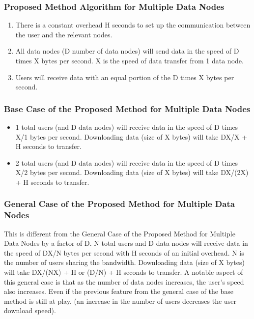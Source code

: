 \documentclass[acmsmall]{acmart}
\begin{document}
\subsubsection{Proposed Method Algorithm for Multiple Data Nodes}
\begin{enumerate}
    \item There is a constant overhead H seconds to set up the communication between the user and the relevant nodes.
    \item All data nodes (D number of data nodes) will send data in the speed of D times X bytes per second. X is the speed of data transfer from 1 data node.
    \item Users will receive data with an equal portion of the D times X bytes per second.
\end{enumerate}


\subsubsection{Base Case of the Proposed Method for Multiple Data Nodes}
\begin{itemize}
    \item 1 total users (and D data nodes) will receive data in the speed of D times X/1 bytes per second. Downloading data (size of X bytes) will take DX/X + H seconds to transfer.
    \item 2 total users (and D data nodes) will receive data in the speed of D times X/2 bytes per second. Downloading data (size of X bytes) will take DX/(2X) + H seconds to transfer.
\end{itemize}




\subsubsection{General Case of the Proposed Method for Multiple Data Nodes} 
This is different from the General Case of the Proposed Method for Multiple Data Nodes by a factor of D. N total users and D data nodes will receive data in the speed of DX/N bytes per second with H seconds of an initial overhead. N is the number of users sharing the bandwidth. Downloading data (size of X bytes)  will take DX/(NX) + H or (D/N) + H seconds to transfer. A notable aspect of this general case is that as the number of data nodes increases, the user's speed also increases. Even if the previous feature from the general case of the base method is still at play, (an increase in the number of users decreases the user download speed).
\end{document}
